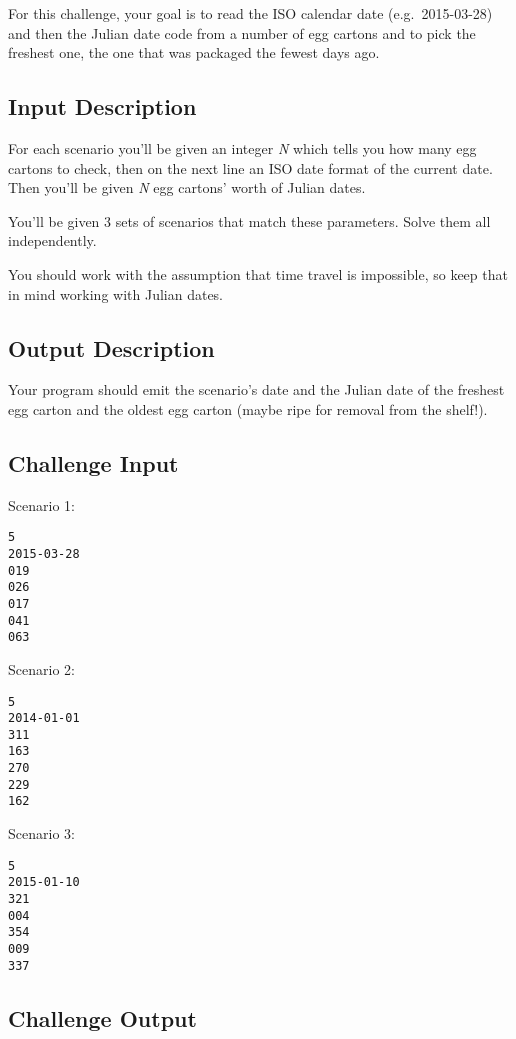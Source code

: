 For this challenge, your goal is to read the ISO calendar date
(e.g.~2015-03-28) and then the Julian date code from a number of egg
cartons and to pick the freshest one, the one that was packaged the
fewest days ago.

\subsection{Input Description}\label{input-description-17}

For each scenario you'll be given an integer \emph{N} which tells you
how many egg cartons to check, then on the next line an ISO date format
of the current date. Then you'll be given \emph{N} egg cartons' worth of
Julian dates.

You'll be given 3 sets of scenarios that match these parameters. Solve
them all independently.

You should work with the assumption that time travel is impossible, so
keep that in mind working with Julian dates.

\subsection{Output Description}\label{output-description-18}

Your program should emit the scenario's date and the Julian date of the
freshest egg carton and the oldest egg carton (maybe ripe for removal
from the shelf!).

\subsection{Challenge Input}\label{challenge-input-19}

Scenario 1:

\begin{verbatim}
5
2015-03-28
019 
026 
017 
041 
063 
\end{verbatim}

Scenario 2:

\begin{verbatim}
5 
2014-01-01
311 
163 
270 
229 
162 
\end{verbatim}

Scenario 3:

\begin{verbatim}
5
2015-01-10
321 
004
354
009 
337 
\end{verbatim}

\subsection{Challenge Output}\label{challenge-output-16}

